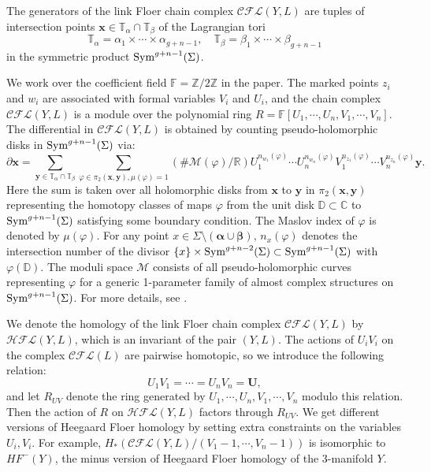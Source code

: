 \documentclass{amsart}
\newcommand{\F}{\mathbb{F}}
\newcommand{\cCFL}{\mathcal{C\!F\!L}}
\newcommand{\cHFL}{\mathcal{H\!F\! L}}
\newcommand{\alphas}{\boldsymbol{\alpha}}
\newcommand{\betas}{\boldsymbol{\beta}}
\newcommand{\x}{\mathbf{x}}
\newcommand{\y}{\mathbf{y}}
\def\x{\mathbf{x}}
\def\y{\mathbf{y}}
\newcommand{\Z}{\mathbb{Z}}
\newcommand{\R}{\mathbb{R}}
\newcommand{\UU}{\mathbf{U}}
\begin{document}
The generators of the link Floer chain complex $\cCFL(Y, L)$ are tuples of intersection points $\x\in \mathbb{T}_\alpha\cap \mathbb{T}_{\beta}$ of the Lagrangian tori
$$\mathbb{T}_\alpha=\alpha_1\times \cdots \times \alpha_{g+n-1}, \quad \mathbb{T}_{\beta}=\beta_1\times \cdots \times \beta_{g+n-1}$$
in the symmetric product $\textup{Sym}^{g+n-1}(\Sigma)$. 
 
We work over the coefficient field $\F=\Z/ 2\Z$ in the paper. The marked points $z_i$ and $w_i$ are associated with formal variables $V_i$ and $U_i$, and the chain complex $\cCFL(Y,L)$ is a module over  the polynomial ring $R=\F[U_1, \cdots, U_n, V_1, \cdots, V_n]$. The differential in $\cCFL(Y, L)$ is obtained by counting pseudo-holomorphic disks in $\textup{Sym}^{g+n-1}(\Sigma)$ via:
\begin{equation}
\label{eq: HF differential}
\partial \x=\sum_{\y\in \mathbb{T}_\alpha\cap \mathbb{T}_\beta}\sum_{\varphi\in \pi_2(\x, \y),\mu(\varphi)=1}(\# \mathcal{M}(\varphi)/\R) U_1^{n_{w_1}(\varphi)}\cdots U_n^{n_{w_{n}}(\varphi)}V_1^{n_{z_{1}}(\varphi)}\cdots V_n^{n_{z_n}(\varphi)} \y. 
\end{equation}
Here the sum is taken over all holomorphic disks from $\x$ to $\y$ in $\pi_2(\x, \y)$ representing the homotopy classes of maps $\varphi$ from the unit disk $\mathbb{D}\subset \mathbb{C} $ to $\textup{Sym}^{g+n-1}(\Sigma)$ satisfying some boundary condition.  The Maslov index of $\varphi$ is denoted by $\mu(\varphi)$. For any point $x\in \Sigma\setminus (\alphas\cup \betas)$, $n_x(\varphi)$ denotes the intersection number of the divisor $\{x\} \times \textup{Sym}^{g+n-2}(\Sigma)\subset \textup{Sym}^{g+n-1}(\Sigma)$ with $\varphi(\mathbb{D})$.  The moduli space $\mathcal{M}$ consists of all pseudo-holomorphic curves representing $\varphi$ for a generic 1-parameter family of almost complex structures on $\textup{Sym}^{g+n-1}(\Sigma)$. For more details, see \cite{OSProperties}. 

We denote the homology of the link Floer chain complex $\cCFL(Y, L)$ by $\cHFL(Y, L)$, which is an invariant of the pair $(Y, L)$.  The actions of $U_iV_i$ on the complex $\cCFL(L)$ are pairwise homotopic, so we introduce the following relation:
$$U_1V_1=\cdots =U_nV_n=\UU,$$
and let $R_{UV}$ denote the ring generated by $U_1, \cdots, U_n, V_1, \cdots, V_n$ modulo this relation.  Then the action of $R$ on $\cHFL(Y, L)$ factors through $R_{UV}$. We get different versions of Heegaard Floer homology by setting extra constraints on the  variables $U_i, V_i$. For example, $H_\ast(\cCFL(Y, L)/(V_1-1, \cdots, V_n-1))$ is isomorphic to $\mathit{HF}^-(Y)$, the minus version of Heegaard Floer homology of the 3-manifold $Y$. 
\end{document}
